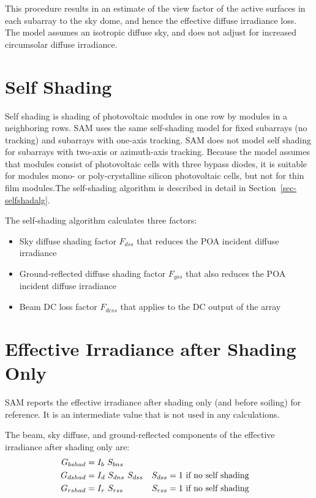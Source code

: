 \documentclass[12pt,letterpaper]{article}
\begin{document}
This procedure results in an estimate of the view factor of the active surfaces in each subarray to the sky dome, and hence the effective diffuse irradiance loss.  The model assumes an isotropic diffuse sky, and does not adjust for increased circumsolar diffuse irradiance.

\section{Self Shading}\label{sec-selfshad}

Self shading is shading of photovoltaic modules in one row by modules in a neighboring rows. SAM uses the same self-shading model for fixed subarrays (no tracking) and subarrays with one-axis tracking. SAM does not model self shading for subarrays with two-axis or azimuth-axis tracking. Because the model assumes that modules consist of photovoltaic cells with three bypass diodes, it is suitable for modules mono- or poly-crystalline silicon photovoltaic cells, but not for thin film modules.The self-shading algorithm is described in detail in Section~\ref{sec-selfshadalg}.

The self-shading algorithm calculates three factors:
\begin{itemize}
\item Sky diffuse shading factor $F_{dss}$ that reduces the POA incident diffuse irradiance
\item Ground-reflected diffuse shading factor $F_{gss}$ that also reduces the POA incident diffuse irradiance
\item Beam DC loss factor $F_{dcss}$ that applies to the DC output of the array
\end{itemize}

\section{Effective Irradiance after Shading Only}

SAM reports the effective irradiance after shading only (and before soiling) for reference. It is an intermediate value that is not used in any calculations.

The beam, sky diffuse, and ground-reflected components of the effective irradiance after shading only are:
\begin{align}
G_{bshad} &= I_b~S_{bns}\notag\\
G_{dshad} &= I_d~S_{dns}~S_{dss} & S_{dss}&=1 ~\text{if no self shading} \notag\\
G_{rshad} &= I_r~S_{rss} & S_{rss}&=1 ~\text{if no self shading}
\end{align}
\end{document}
